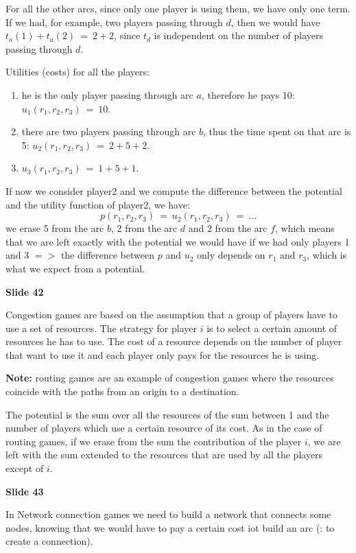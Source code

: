 \documentclass[pt11,a4paper,twoside,reqno,openright]{paper}
\begin{document}
\noindent For all the other arcs, since only one player is using them, we 
have only one term. If we had, for example, two players passing through 
$d$, then we would have $t_a(1)+t_a(2)~=~2+2$, since $t_d$ is independent 
on the number of players passing through $d$.

\noindent Utilities (costs) for all the players:
\begin{enumerate}
	\item he is the only player passing through arc $a$, therefore he 
		pays 10: $u_1(r_1,r_2,r_3)~=~10$.
	\item there are two players passing through arc $b$, thus the time 
		spent on that arc is 5: $u_2(r_1,r_2,r_3)~=~2+5+2$.
	\item $u_3(r_1,r_2,r_3)~=~1+5+1$.
\end{enumerate}

\noindent If now we consider player2 and we compute the difference between 
the potential and the utility function of player2, we have: 
\[
	p(r_1,r_2,r_3)~=~u_2(r_1,r_2,r_3)~=~...
\]
we erase 5 from the arc $b$, 2 from the arc $d$ and 2 from the arc $f$, which 
means that we are left exactly with the potential we would have if we had 
only players 1 and 3 $=>$ the difference between $p$ and $u_2$ only depends 
on $r_1$ and $r_3$, which is what we expect from a potential.

\bigskip
\noindent \textbf{Slide 42}

\noindent Congestion games are based on the assumption that a group of 
players have to use a set of resources. The strategy for player $i$ is to 
select a certain amount of resources he has to use. The cost of a resource 
depends on the number of player that want to use it and each player only 
pays for the resources he is using.

\noindent \textbf{Note:} routing games are an example of congestion games 
where the resources coincide with the paths from an origin to a destination.

\noindent The potential is the sum over all the resources of the sum between 
1 and the number of players which use a certain resource of its cost. As in 
the case of routing games, if we erase from the sum the contribution of the 
player $i$, we are left with the sum extended to the resources that are used 
by all the players except of $i$.

\bigskip
\noindent \textbf{Slide 43}

\noindent In Network connection games we need to build a network that connects 
some nodes, knowing that we would have to pay a certain cost iot build an 
arc (: to create a connection).
\end{document}
